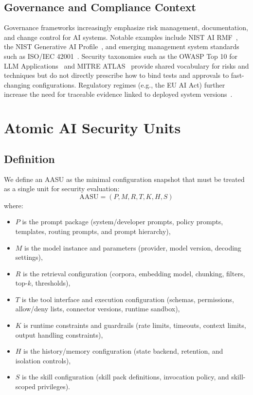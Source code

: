 \documentclass[11pt]{article}
\newcommand{\AASU}{\textsc{AASU}}
\newcommand{\AASUm}{\mathrm{AASU}}
\begin{document}
\subsection{Governance and Compliance Context}
Governance frameworks increasingly emphasize risk management, documentation, and change control for AI systems.
Notable examples include NIST AI RMF~\cite{nist_airmf}, the NIST Generative AI Profile~\cite{nist_genai_profile}, and emerging management system standards such as ISO/IEC 42001~\cite{iso_42001}.
Security taxonomies such as the OWASP Top 10 for LLM Applications~\cite{owasp_llm_top10} and MITRE ATLAS~\cite{mitre_atlas}
provide shared vocabulary for risks and techniques but do not directly prescribe how to bind tests and approvals to fast-changing configurations.
Regulatory regimes (e.g., the EU AI Act) further increase the need for traceable evidence linked to deployed system versions~\cite{eu_ai_act}.

\section{Atomic AI Security Units}
\subsection{Definition}
We define an \AASU{} as the minimal configuration snapshot that must be treated as a single unit for security evaluation:
\begin{equation}
  \AASUm = (P, M, R, T, K, H, S)
\end{equation}
where:
\begin{itemize}[leftmargin=*,itemsep=2pt]
  \item $P$ is the prompt package (system/developer prompts, policy prompts, templates, routing prompts, and prompt hierarchy),
  \item $M$ is the model instance and parameters (provider, model version, decoding settings),
  \item $R$ is the retrieval configuration (corpora, embedding model, chunking, filters, top-$k$, thresholds),
  \item $T$ is the tool interface and execution configuration (schemas, permissions, allow/deny lists, connector versions, runtime sandbox),
  \item $K$ is runtime constraints and guardrails (rate limits, timeouts, context limits, output handling constraints),
  \item $H$ is the history/memory configuration (state backend, retention, and isolation controls),
  \item $S$ is the skill configuration (skill pack definitions, invocation policy, and skill-scoped privileges).
\end{itemize}
\end{document}
